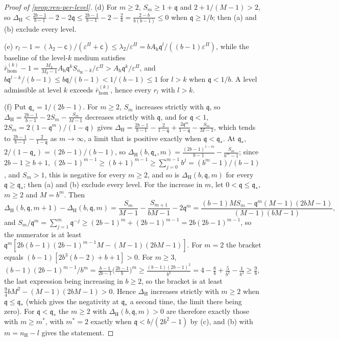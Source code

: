 \begin{proof}[Proof of \cref{prop:ren-per-level}]
(d) For $m\ge2$, $S_m\ge1+\mathfrak q$ and $2+1/(M-1)>2$, so $\Delta_{\mathrm H}<\frac{2b-1}{b-1}-2-2\mathfrak q\le\frac{2b-1}{b-1}-2-\frac2b=\frac{2-b}{b(b-1)}\le0$ when $\mathfrak q\ge1/b$; then (a) and (b) exclude every level.

(e) $r_l-1=(\lambda_2-\mathsf c)/(\varepsilon^\Pi+\mathsf c)\le\lambda_2/\varepsilon^\Pi=bA_{\mathrm h}\mathfrak q^l/((b-1)\varepsilon^\Pi)$, while the baseline of the level-$k$ medium satisfies $\bar r^{(k)}_{\mathrm{hom}}-1=\frac{M_k}{M_k-1}A_{\mathrm h}\mathfrak q^kS_{n_{\mathrm H}-k}/\varepsilon^\Pi>A_{\mathrm h}\mathfrak q^k/\varepsilon^\Pi$, and $b\mathfrak q^{l-k}/(b-1)\le b\mathfrak q/(b-1)<1/(b-1)\le1$ for $l>k$ when $\mathfrak q<1/b$. A level admissible at level $k$ exceeds $\bar r^{(k)}_{\mathrm{hom}}$, hence every $r_l$ with $l>k$.

(f) Put $\mathfrak q_\ast=1/(2b-1)$. For $m\ge2$, $S_m$ increases strictly with $\mathfrak q$, so $\Delta_{\mathrm H}=\frac{2b-1}{b-1}-2S_m-\frac{S_m}{M-1}$ decreases strictly with $\mathfrak q$, and for $\mathfrak q<1$, $2S_m=2(1-\mathfrak q^m)/(1-\mathfrak q)$ gives $\Delta_{\mathrm H}=\frac{2b-1}{b-1}-\frac2{1-\mathfrak q}+\frac{2\mathfrak q^m}{1-\mathfrak q}-\frac{S_m}{M-1}$, which tends to $\frac{2b-1}{b-1}-\frac2{1-\mathfrak q}$ as $m\to\infty$, a limit that is positive exactly when $\mathfrak q<\mathfrak q_\ast$. At $\mathfrak q_\ast$, $2/(1-\mathfrak q_\ast)=(2b-1)/(b-1)$, so $\Delta_{\mathrm H}(b,\mathfrak q_\ast,m)=\frac{(2b-1)^{1-m}}{b-1}-\frac{S_m}{b^m-1}$; since $2b-1\ge b+1$, $(2b-1)^{m-1}\ge(b+1)^{m-1}\ge\sum_{j=0}^{m-1}b^j=(b^m-1)/(b-1)$, and $S_m>1$, this is negative for every $m\ge2$, and so is $\Delta_{\mathrm H}(b,\mathfrak q,m)$ for every $\mathfrak q\ge\mathfrak q_\ast$; then (a) and (b) exclude every level. For the increase in $m$, let $0<\mathfrak q\le\mathfrak q_\ast$, $m\ge2$ and $M=b^m$. Then
\[
\Delta_{\mathrm H}(b,\mathfrak q,m+1)-\Delta_{\mathrm H}(b,\mathfrak q,m)=\frac{S_m}{M-1}-\frac{S_{m+1}}{bM-1}-2\mathfrak q^m=\frac{(b-1)MS_m-\mathfrak q^m(M-1)(2bM-1)}{(M-1)(bM-1)},
\]
and $S_m/\mathfrak q^m=\sum_{j=1}^m\mathfrak q^{-j}\ge(2b-1)^m+(2b-1)^{m-1}=2b(2b-1)^{m-1}$, so the numerator is at least $\mathfrak q^m[2b(b-1)(2b-1)^{m-1}M-(M-1)(2bM-1)]$. For $m=2$ the bracket equals $(b-1)[2b^3(b-2)+b+1]>0$. For $m\ge3$, $(b-1)(2b-1)^{m-1}/b^m=\frac{b-1}{2b-1}\bigl(\frac{2b-1}b\bigr)^m\ge\frac{(b-1)(2b-1)^2}{b^3}=4-\frac8b+\frac5{b^2}-\frac1{b^3}\ge\frac98$, the last expression being increasing in $b\ge2$, so the bracket is at least $\frac94bM^2-(M-1)(2bM-1)>0$. Hence $\Delta_{\mathrm H}$ increases strictly with $m\ge2$ when $\mathfrak q\le\mathfrak q_\ast$ (which gives the negativity at $\mathfrak q_\ast$ a second time, the limit there being zero). For $\mathfrak q<\mathfrak q_\ast$ the $m\ge2$ with $\Delta_{\mathrm H}(b,\mathfrak q,m)>0$ are therefore exactly those with $m\ge m^\ast$, with $m^\ast=2$ exactly when $\mathfrak q<b/(2b^2-1)$ by (c), and (b) with $m=n_{\mathrm H}-l$ gives the statement.
\end{proof}

